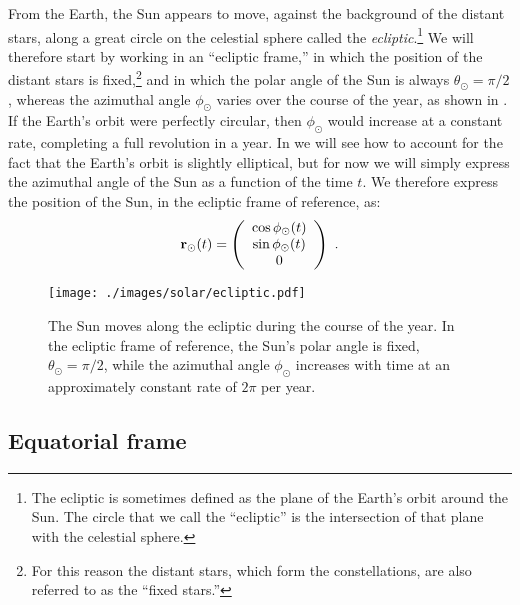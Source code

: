From the Earth, the Sun appears to move, against the background of the distant stars, along a great circle on the celestial sphere called the {\it ecliptic}.\footnote{The ecliptic is sometimes defined as the plane of the Earth's orbit around the Sun.  The circle that we call the ``ecliptic'' is the intersection of that plane with the celestial sphere.}  We will therefore start by working in an ``ecliptic frame,'' in which the position of the distant stars is fixed,\footnote{For this reason the distant stars, which form the constellations, are also referred to as the ``fixed stars.''} and in which the polar angle of the Sun is always $\theta_\odot = \pi / 2$, whereas the azimuthal angle $\phi_\odot$ varies over the course of the year, as shown in .  If the Earth's orbit were perfectly circular, then $\phi_\odot$ would increase at a constant rate, completing a full revolution in a year.  In  we will see how to account for the fact that the Earth's orbit is slightly elliptical, but for now we will simply express the azimuthal angle of the Sun as a function of the time $t$.  We therefore express the position of the Sun, in the ecliptic frame of reference, as:
\begin{equation}
\VV r_\odot (t) = \left( \begin{array}{c} \cos \phi_\odot (t) \\ \sin \phi_\odot (t) \\ 0 \end{array} \right)~.\la{eq:ecliptic}
\end{equation}

\begin{figure} [tbh]
\begin{center}
	\texttt{[image: ./images/solar/ecliptic.pdf]}
\end{center}
\caption{\protect\small The Sun moves along the ecliptic during the course of the year.  In the ecliptic frame of reference, the Sun's polar angle is fixed, $\theta_\odot = \pi / 2$, while the azimuthal angle $\phi_\odot$ increases with time at an approximately constant rate of $2 \pi$ per year.}
\end{figure}

\subsection{Equatorial frame}

